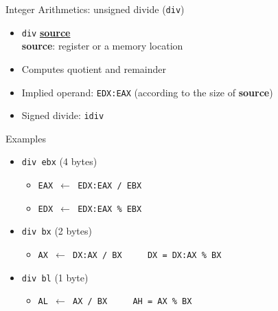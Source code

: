 \documentclass[]{beamer}
\begin{document}
\begin{frame}{Integer Arithmetics: unsigned divide ({\tt div})}
  \begin{itemize}
  \item{{\tt div} \underline{\textbf{source}}}\\
    \textbf{source}: register or a memory location
  \item Computes quotient and remainder
  \item Implied operand: {\tt EDX:EAX} (according to the size of \textbf{source})
  \item Signed divide: {\tt idiv}
  \end{itemize}

  \begin{block}{Examples}
  \begin{itemize}
  \item {\tt div ebx} (4 bytes)
  	\begin{itemize}
  		\item {\tt EAX $\leftarrow$ EDX:EAX / EBX}
		\item {\tt EDX $\leftarrow$ EDX:EAX \% EBX}
  	\end{itemize}
  \item {\tt div bx} (2 bytes)
  	\begin{itemize}
  		\item {\tt AX $\leftarrow$ DX:AX / BX} $\qquad$ {\tt DX = DX:AX \% BX}
  	\end{itemize}
  \item {\tt div bl} (1 byte)
  	\begin{itemize}
  		\item {\tt AL $\leftarrow$ AX / BX} $\qquad$ {\tt AH = AX \% BX}
  	\end{itemize}
  \end{itemize}
  \end{block}
\end{frame}
\end{document}
